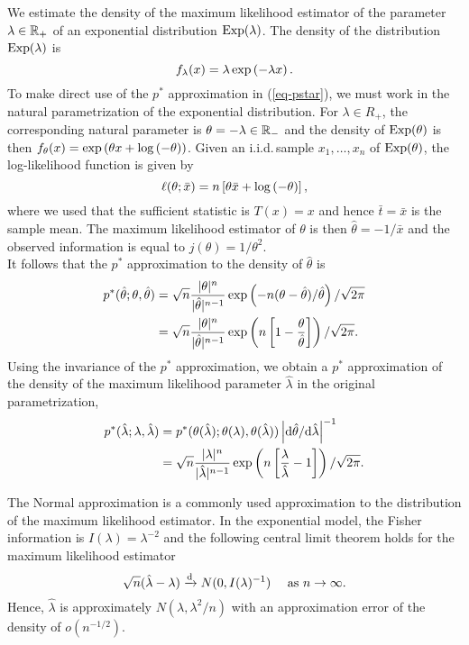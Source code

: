 \begin{example}
    We estimate the density of the maximum likelihood estimator of the parameter $\lambda \in \mathbb{R}_+$ of an exponential distribution ${\textrm{Exp}}(\lambda)$. The density of the distribution ${\textrm{Exp}}(\lambda)$ is
    \begin{equation*}
        f_\lambda(x) = \lambda \exp\left(-\lambda x\right).
    \end{equation*}
    To make direct use of the $p^*$ approximation in (\ref{eq-pstar}), we must work in the natural parametrization of the exponential distribution. For $\lambda \in R_+$, the corresponding natural parameter is $\theta = -\lambda \in \mathbb{R}_-$ and the density of ${\textrm{Exp}}(\theta)$ is then $f_\theta(x) = \exp\left( \theta x + \log\left(-\theta\right)\right)$. Given an i.i.d.\,sample $x_1, \ldots, x_n$ of ${\textrm{Exp}}(\theta)$, the log-likelihood function is given by 
    \begin{equation*}
        \ell(\theta; \bar x) = n\left[\theta \bar x + \log\left(-\theta\right)\right],
    \end{equation*}
    where we used that the sufficient statistic is $T(x) = x$ and hence $\bar t = \bar x$ is the sample mean. The maximum likelihood estimator of $\theta$ is then $\hat\theta = -1/\bar x$ and the observed information is equal to $j(\theta) = 1/\theta^2$.
    \\
    It follows that the $p^*$ approximation to the density of $\hat\theta$ is
    \begin{align*}
        p^*(\hat\theta; \theta, \hat\theta) 
        &= \sqrt{n} \frac{|\theta|^n}{|\hat\theta|^{n-1}}\exp\left(-n(\theta - \hat\theta)/\hat\theta\right) / \sqrt{2\pi}\\
        &= \sqrt{n} \frac{|\theta|^n}{|\hat\theta|^{n-1}}\exp\left(n\left[1 - \frac{\theta}{\hat\theta}\right]\right) / \sqrt{2\pi}.
    \end{align*}
    Using the invariance of the $p^*$ approximation, we obtain a $p^*$ approximation of the density of the maximum likelihood parameter $\hat\lambda$ in the original parametrization,
    \begin{align}
        p^*(\hat\lambda; \lambda, \hat\lambda) 
        &= p^*(\theta(\hat\lambda); \theta(\lambda), \theta(\hat\lambda)) \left|\text{d} \hat\theta / \text{d} \hat\lambda\right|^{-1} \nonumber\\
        &= \sqrt{n} \frac{|\lambda|^n}{|\hat\lambda|^{n-1}}\exp\left(n\left[\frac{\lambda}{\hat\lambda} - 1\right]\right) / \sqrt{2\pi}. \label{eq-pstar-lambda}
    \end{align}
    
    The Normal approximation is a commonly used approximation to the distribution of the maximum likelihood estimator. In the exponential model, the Fisher information is $I(\lambda) = \lambda^{-2}$ and the following central limit theorem holds for the maximum likelihood estimator \cite[Example 3.12]{lehmann2006theory}
    \begin{equation} \label{eq-normal-lambda}
        \sqrt{n}(\hat\lambda - \lambda) \xrightarrow[]{\text{d}} N(0, I(\lambda)^{-1})\ \ \ \  {\textrm{as }} n \rightarrow \infty.
    \end{equation}
    Hence, $\hat\lambda$ is approximately $N(\lambda, \lambda^2/n)$ with an approximation error of the density of $o(n^{-1/2})$. 
    

\end{example}
